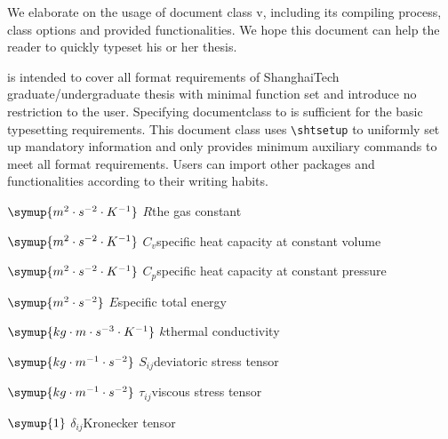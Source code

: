 \documentclass[doctor]{shtthesis}
\makeatletter
\def\ifgraduate{\ifsht@graduate}
\makeatother
\begin{document}
\maketitle

\frontmatter
\begin{abstract}[flattitle]
  本文档阐述 \shtthesis{} v\version{} 的使用方法，包括其编译方式、文档类选项以及提供的功能。希望能够帮助读者快速便捷地完成学位论文排版。

  \shtthesis{} 旨在以最简实现和最小依赖完整覆盖上海科技大学本科及研究生学位论文的所有格式要求，且不为用户额外设限。使用时仅需指定 documentclass 为 \shtthesis{} 即可满足基本排版要求。文档通过 \verb|\shtsetup| 命令统一设定学位论文信息，且仅提供满足格式需求的最少额外命令以保证兼容性。用户可根据自身撰文习惯，引入额外的宏包和命令完成学位论文撰写。
\end{abstract}

\begin{abstract*}[flattitle]
  We elaborate on the usage of document class \shtthesis{} v\version{}, including its compiling process, class options and provided functionalities. We hope this document can help the reader to quickly typeset his or her thesis. 

  \shtthesis{} is intended to cover all format requirements of ShanghaiTech graduate/undergraduate thesis with minimal function set and introduce no restriction to the user. Specifying documentclass to \shtthesis{} is suﬀicient for the basic typesetting requirements. This document class uses \verb|\shtsetup| to uniformly set up mandatory information and only provides minimum auxiliary commands to meet all format requirements. Users can import other packages and functionalities according to their writing habits. 
\end{abstract*}

\makeindices

\ifgraduate
\begin{nomenclatures}
  \item[$\symup{{m^{2} \cdot s^{-2} \cdot K^{-1}}}$]{$R$}{the gas constant}
  \item[$\symup{{m^{2} \cdot s^{-2} \cdot K^{-1}}}$]{$C_v$}{specific heat capacity at constant volume}
  \item[$\symup{{m^{2} \cdot s^{-2} \cdot K^{-1}}}$]{$C_p$}{specific heat capacity at constant pressure}
  \item[$\symup{{m^{2} \cdot s^{-2}}}$]{$E$}{specific total energy}
  \item[$\symup{{kg \cdot m \cdot s^{-3} \cdot K^{-1}}}$]{$k$}{thermal conductivity}
  \item[$\symup{{kg \cdot m^{-1} \cdot s^{-2}}}$]{$S_{ij}$}{deviatoric stress tensor}
  \item[$\symup{{kg \cdot m^{-1} \cdot s^{-2}}}$]{$\tau_{ij}$}{viscous stress tensor}
  \item[$\symup{{1}}$]{$\delta_{ij}$}{Kronecker tensor}
\end{nomenclatures}
\end{document}
